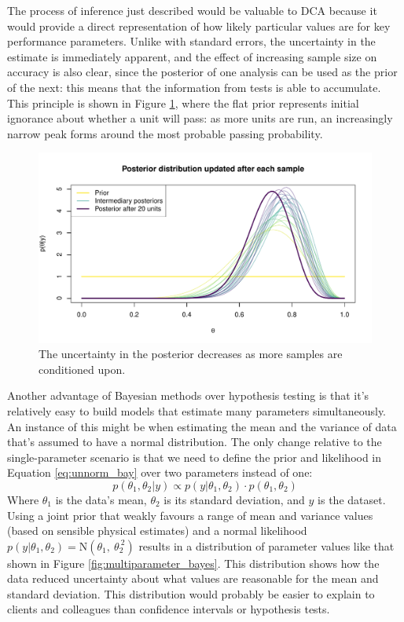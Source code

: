 \documentclass[11pt,a4paper,article]{memoir} %
\begin{document}
The process of inference just described would be valuable to DCA because it would provide a direct representation of how likely particular values are for key performance parameters. Unlike with standard errors, the uncertainty in the estimate is immediately apparent, and the effect of increasing sample size on accuracy is also clear, since the posterior of one analysis can be used as the prior of the next: this means that the information from tests is able to accumulate. This principle is shown in Figure \ref{fig:updating_posterior}, where the flat prior represents initial ignorance about whether a unit will pass: as more units are run, an increasingly narrow peak forms around the most probable passing probability.
\begin{figure}
\includegraphics[width=\textwidth]{updating_posterior.pdf}
\caption{The uncertainty in the posterior decreases as more samples are conditioned upon.}
\label{fig:updating_posterior}
\end{figure}
\par

Another advantage of Bayesian methods over hypothesis testing is that it's relatively easy to build models that estimate many parameters simultaneously. An instance of this might be when estimating the mean and the variance of data that's assumed to have a normal distribution. The only change relative to the single-parameter scenario is that we need to define the prior and likelihood in Equation \ref{eq:unnorm_bay} over two parameters instead of one:
\begin{equation}
	p(\theta_1, \theta_2 | y) \propto p(y|\theta_1, \theta_2) \cdot p(\theta_1, \theta_2)
\end{equation}
Where $\theta_1$ is the data's mean, $\theta_2$ is its standard deviation, and $y$ is the dataset. Using a joint prior that weakly favours a range of mean and variance values (based on sensible physical estimates) and a normal likelihood $p(y|\theta_1, \theta_2) = \text{N}(\theta_1, \ \theta_2^{\ 2})$ results in a distribution of parameter values like that shown in Figure \ref{fig:multiparameter_bayes}. This distribution shows how the data reduced uncertainty about what values are reasonable for the mean and standard deviation. This distribution would probably be easier to explain to clients and colleagues than confidence intervals or hypothesis tests.
\end{document}
